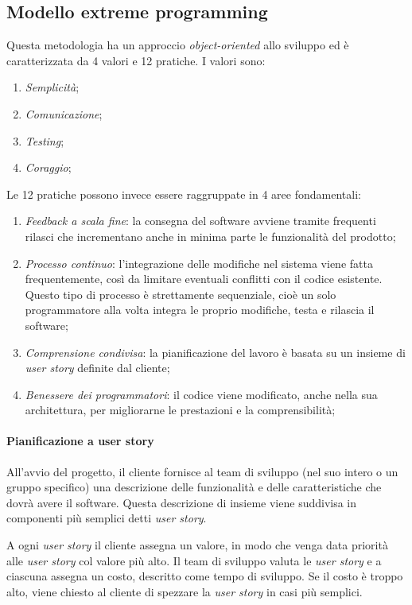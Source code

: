 \documentclass[12pt, a4paper]{report}
\theoremstyle{def}
\theoremstyle{definition}
\begin{document}
\subsection{Modello extreme programming}
Questa metodologia ha un approccio \emph{object-oriented} allo sviluppo ed è
caratterizzata da 4 valori e 12 pratiche. I valori sono:
\begin{enumerate}
    \item \emph{Semplicità};
    \item \emph{Comunicazione};
    \item \emph{Testing};
    \item \emph{Coraggio};
\end{enumerate}
Le 12 pratiche possono invece essere raggruppate in 4 aree fondamentali:
\begin{enumerate}
    \item \emph{Feedback a scala fine}: la consegna del software avviene
    tramite frequenti rilasci che incrementano anche in minima parte le
    funzionalità del prodotto;
    \item \emph{Processo continuo}: l'integrazione delle modifiche nel sistema
    viene fatta frequentemente, così da limitare eventuali conflitti con il
    codice esistente. Questo tipo di processo è strettamente sequenziale, cioè
    un solo programmatore alla volta integra le proprio modifiche, testa e
    rilascia il software;
    \item \emph{Comprensione condivisa}: la pianificazione del lavoro è basata
    su un insieme di \emph{user story} definite dal cliente;
    \item \emph{Benessere dei programmatori}: il codice viene modificato, anche
    nella sua architettura, per migliorarne le prestazioni e la comprensibilità;
\end{enumerate}
\paragraph{Pianificazione a user story}
All'avvio del progetto, il cliente fornisce al team di sviluppo (nel suo intero
o un gruppo specifico) una descrizione delle funzionalità e delle caratteristiche
che dovrà avere il software. Questa descrizione di insieme viene suddivisa in
componenti più semplici detti \emph{user story}.

A ogni \emph{user story} il cliente assegna un valore, in modo che venga data
priorità alle \emph{user story} col valore più alto. Il team di sviluppo valuta
le \emph{user story} e a ciascuna assegna un costo, descritto come tempo di
sviluppo. Se il costo è troppo alto, viene chiesto al cliente di spezzare la
\emph{user story} in casi più semplici.
\end{document}
